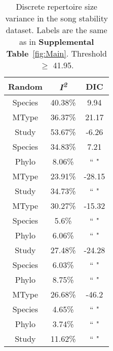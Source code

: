 \documentclass{article}
\begin{document}
  \begin{table}[H]
  \centering
  \caption{Discrete repertoire size variance in the song stability dataset. Labels are the same as in \textbf{Supplemental Table}~\ref{fig:Main}. Threshold $\ge$ 41.95.} 
  \begin{tabular}{ccc}
  \hline
  Random & \textit{I\textsuperscript{2}} & DIC \\ 
  \hline
  Species & 40.38\% & 9.94 \\ \hdashline
  MType & 36.37\% & 21.17 \\ \hdashline
  Study & 53.67\% & -6.26 \\ \hdashline
  Species & 34.83\% & 7.21 \\ 
  Phylo & 8.06\% & `` " \\ \hdashline
  MType & 23.91\% & -28.15 \\ 
  Study & 34.73\% & `` " \\ \hdashline
  MType & 30.27\% & -15.32 \\ 
  Species & 5.6\% & `` " \\ 
  Phylo & 6.06\% & `` " \\ \hdashline
  Study & 27.48\% & -24.28 \\ 
  Species & 6.03\% & `` " \\ 
  Phylo & 8.75\% & `` " \\ \hdashline
  MType & 26.68\% & -46.2 \\ 
  Species & 4.65\% & `` " \\ 
  Phylo & 3.74\% & `` " \\ 
  Study & 11.62\% & `` " \\ 
  \hline
  \end{tabular}
  \end{table}
\end{document}
